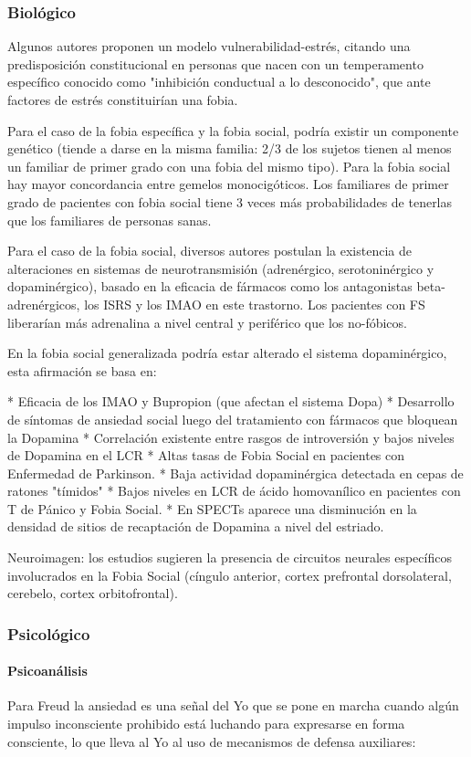 \documentclass{scrbook}
\begin{document}
\subsubsection*{Biológico}
Algunos autores proponen un modelo vulnerabilidad-estrés, citando una predisposición constitucional en personas que nacen con un temperamento específico conocido como "inhibición conductual a lo desconocido", que ante factores de estrés constituirían una fobia.

Para el caso de la fobia específica y la fobia social, podría existir un componente genético (tiende a darse en la misma familia: 2/3 de los sujetos tienen al menos un familiar de primer grado con una fobia del mismo tipo). Para la fobia social hay mayor concordancia entre gemelos monocigóticos. Los familiares de primer grado de pacientes con fobia social tiene 3 veces más probabilidades de tenerlas que los familiares de personas sanas.

Para el caso de la fobia social, diversos autores postulan la existencia de alteraciones en sistemas de neurotransmisión (adrenérgico, serotoninérgico y dopaminérgico), basado en la eficacia de fármacos como los antagonistas beta-adrenérgicos, los ISRS y los IMAO en este trastorno. Los pacientes con FS liberarían más adrenalina a nivel central y periférico que los no-fóbicos.

En la fobia social generalizada podría estar alterado el sistema dopaminérgico, esta afirmación se basa en:

* Eficacia de los IMAO y Bupropion (que afectan el sistema Dopa)
* Desarrollo de síntomas de ansiedad social luego del tratamiento con fármacos que bloquean la Dopamina
* Correlación existente entre rasgos de introversión y bajos niveles de Dopamina en el LCR
* Altas tasas de Fobia Social en pacientes con Enfermedad de Parkinson.
* Baja actividad dopaminérgica detectada en cepas de ratones "tímidos"
* Bajos niveles en LCR de ácido homovanílico en pacientes con T de Pánico y Fobia Social.
* En SPECTs aparece una disminución en la densidad de sitios de recaptación de Dopamina a nivel del estriado.

Neuroimagen: los estudios sugieren la presencia de circuitos neurales específicos involucrados en la Fobia Social (cíngulo anterior, cortex prefrontal dorsolateral, cerebelo, cortex orbitofrontal).
\subsubsection*{Psicológico}
\paragraph{Psicoanálisis}
Para Freud la ansiedad es una señal del Yo que se pone en marcha cuando algún impulso inconsciente prohibido está luchando para expresarse en forma consciente, lo que lleva al Yo al uso de mecanismos de defensa auxiliares:
\end{document}
